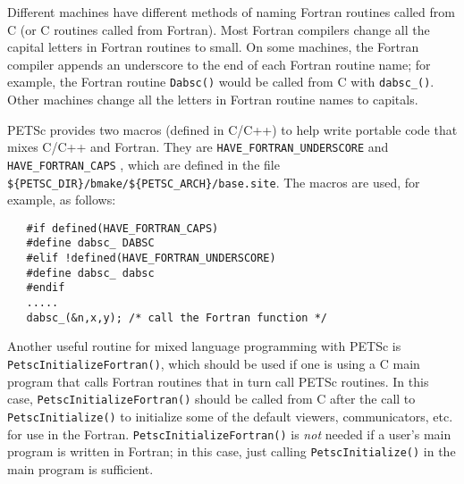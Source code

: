 {%

Different machines have
different methods of naming Fortran routines called from C 
(or C routines called from Fortran). Most Fortran compilers change
all the capital letters in Fortran routines to small. On some machines, the 
Fortran compiler appends an underscore to the end of each Fortran 
routine name; for example, the Fortran routine {\tt Dabsc()}
would be called from C with {\tt dabsc\_()}.  Other machines
change all the letters in Fortran routine names to capitals. 

PETSc provides two macros (defined in C/C++) to help write 
portable code that mixes C/C++ and Fortran. They are 
{\tt HAVE\_FORTRAN\_UNDERSCORE} and {\tt HAVE\_FORTRAN\_CAPS}
 ,
which are defined in the file {\tt \$\{PETSC\_DIR\}/bmake/\$\{PETSC\_ARCH\}/base.site}.
The macros are used, for example, as follows:
\begin{verbatim}
   #if defined(HAVE_FORTRAN_CAPS)
   #define dabsc_ DABSC
   #elif !defined(HAVE_FORTRAN_UNDERSCORE)
   #define dabsc_ dabsc
   #endif
   .....
   dabsc_(&n,x,y); /* call the Fortran function */
\end{verbatim}

Another useful routine for mixed language programming with PETSc is
{\tt PetscInitializeFortran()}, which should be used if one is using a
C main program that calls Fortran routines that in turn call PETSc
routines.  In this case, {\tt PetscInitializeFortran()} should be
called from C after the call to {\tt PetscInitialize()} to initialize
some of the default viewers, communicators, etc.  for use in the
Fortran.  {\tt PetscInitializeFortran()} is {\em not} needed if a
user's main program is written in Fortran; in this case, just calling
{\tt PetscInitialize()} in the main program is sufficient.

}
